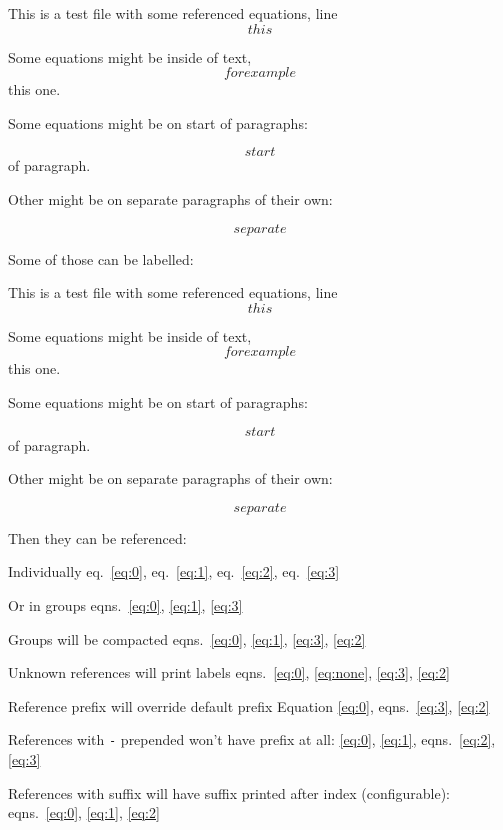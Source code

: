 This is a test file with some referenced equations, line \[ this \]

Some equations might be inside of text, \[ for example \] this one.

Some equations might be on start of paragraphs:

\[ start \] of paragraph.

Other might be on separate paragraphs of their own:

\[ separate \]

Some of those can be labelled:

This is a test file with some referenced equations, line
\begin{equation} this \label{eq:0}\end{equation}

Some equations might be inside of text,
\begin{equation} for example \label{eq:1}\end{equation} this one.

Some equations might be on start of paragraphs:

\begin{equation} start \label{eq:2}\end{equation} of paragraph.

Other might be on separate paragraphs of their own:

\begin{equation} separate \label{eq:3}\end{equation}

Then they can be referenced:

Individually eq.~\ref{eq:0}, eq.~\ref{eq:1}, eq.~\ref{eq:2},
eq.~\ref{eq:3}

Or in groups eqns.~\ref{eq:0}, \ref{eq:1}, \ref{eq:3}

Groups will be compacted
eqns.~\ref{eq:0}, \ref{eq:1}, \ref{eq:3}, \ref{eq:2}

Unknown references will print labels
eqns.~\ref{eq:0}, \ref{eq:none}, \ref{eq:3}, \ref{eq:2}

Reference prefix will override default prefix Equation \ref{eq:0},
eqns.~\ref{eq:3}, \ref{eq:2}

References with \texttt{-} prepended won’t have prefix at all:
\ref{eq:0}, \ref{eq:1}, eqns.~\ref{eq:2}, \ref{eq:3}

References with suffix will have suffix printed after index
(configurable): eqns.~\ref{eq:0}, \ref{eq:1}, \ref{eq:2}